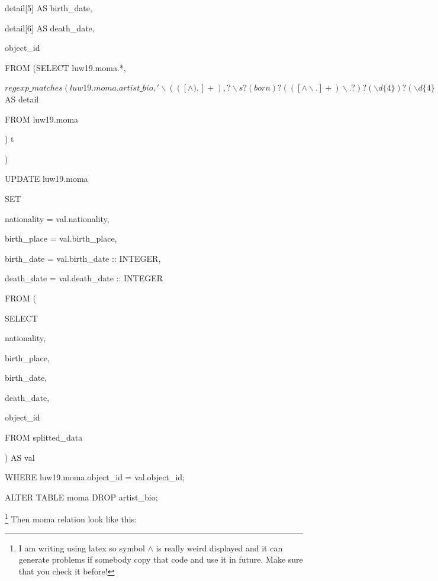 \documentclass[journal,transmag]{IEEEtran}
\begin{document}
       detail[5] AS birth\_date,

       detail[6] AS death\_date,

       object\_id

FROM (SELECT luw19.moma.*,

           $  regexp\_matches(luw19.moma.artist\_bio, '\backslash (([ \wedge ),]+),?\backslash s?(born )?(([\wedge \backslash .]+)\backslash .? )?(\backslash d\{4\})?(\backslash d\{4\})?\backslash )')$ AS detail

      FROM luw19.moma

     ) t

)

UPDATE luw19.moma

SET

  nationality = val.nationality,

  birth\_place = val.birth\_place,

  birth\_date = val.birth\_date :: INTEGER,

  death\_date = val.death\_date :: INTEGER

FROM (

       SELECT

         nationality,

         birth\_place,

         birth\_date,

         death\_date,

         object\_id

       FROM splitted\_data

     ) AS val

WHERE luw19.moma.object\_id = val.object\_id;
\newline

ALTER TABLE moma DROP artist\_bio;

\footnote{I am writing using latex so symbol $\wedge$ is really weird displayed and it can generate problems if somebody copy that code and use it in future. Make sure that you check it before!}
\newpage
Then moma relation look like this:
\end{document}
